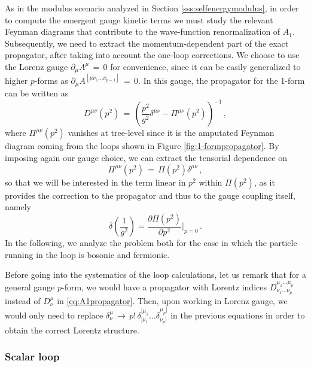 As in the modulus scenario analyzed in Section \ref{sss:selfenergymodulus}, in order to compute the emergent gauge kinetic terms we must study the relevant Feynman diagrams that contribute to the wave-function renormalization of $A_1$. Subsequently, we need to extract the momentum-dependent part of the exact propagator, after taking into account the one-loop corrections. We choose to use the Lorenz gauge $\partial_\mu A^{\mu}\, =\, 0$ for convenience, since it can be easily generalized to higher $p$-forms as $\partial_\mu A^{[\mu \nu_1 \ldots \nu_{p-1}]}\, = \, 0$. In this gauge, the propagator for the 1-form can be written as
%
\begin{equation}
		\label{eq:A1propagator}
		D^{\mu \nu} (p^2) \, = \, \left( \dfrac{p^2}{g^2} \delta ^{\mu \nu} - \Pi^{\mu \nu}(p^2) \right)^{-1}\, ,
\end{equation}
%
where $\Pi^{\mu \nu}(p^2)$ vanishes at tree-level since it is the amputated Feynman diagram coming from the loops shown in Figure \ref{fig:1-formpropagator}. By imposing again our gauge choice, we can extract the tensorial dependence on
%
\begin{equation}
		\label{eq:A1loopamplitude}
		\Pi^{\mu \nu} (p^2) \, = \, \Pi(p^2) \delta ^{\mu \nu} \, ,
\end{equation}
%
so that we will be interested in the term linear in $p^2$ within $\Pi(p^2)$, as it provides the correction to the propagator and thus to the gauge coupling itself, namely
%
\begin{equation}\label{eq:gaugecouplingcorrection}
		\delta\left(\dfrac{1}{g^2} \right) = \frac {\partial \Pi(p^2)}{\partial p^2} \bigg\rvert_{p=0}\, .
\end{equation}
%
In the following, we analyze the problem both for the case in which the particle running in the loop is bosonic and fermionic.
	
Before going into the systematics of the loop calculations, let us remark that for a general gauge $p$-form, we would have a propagator with Lorentz indices $D^{\mu_1 \ldots \mu_p}_{{\nu_1 \ldots \nu_p}}$ instead of $D^\mu_\nu$ in \eqref{eq:A1propagator}. Then, upon working in Lorenz gauge, we would only need to replace ${\delta^{\mu}_\nu \, \to \, p! \, \delta^{[\mu_1}_{[\nu_1}\ldots \delta^{\mu_p]}_{\nu_p]}}$ in the previous equations in order to obtain the correct Lorentz structure.
	
\subsubsection*{Scalar loop}
	
